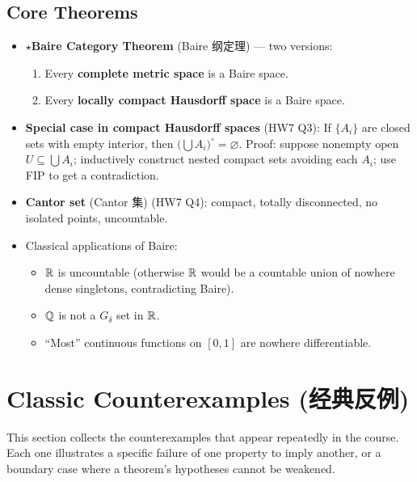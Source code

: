\documentclass{article}
\newcommand{\starKey}{\textcolor{red!65!black}{\textbf{$\star$}}}
\begin{document}
\subsection{Core Theorems}

\begin{itemize}
  \item \starKey \textbf{Baire Category Theorem} (Baire 纲定理) --- two versions:
  \begin{enumerate}
    \item Every \textbf{complete metric space} is a Baire space.
    \item Every \textbf{locally compact Hausdorff space} is a Baire space.
  \end{enumerate}

  \item \textbf{Special case in compact Hausdorff spaces} (HW7 Q3):
  If $\{A_i\}$ are closed sets with empty interior, then
  $\bigl(\bigcup A_i\bigr)^\circ=\varnothing$.
  Proof: suppose nonempty open $U\subseteq\bigcup A_i$; inductively construct nested
  compact sets avoiding each $A_i$; use FIP to get a contradiction.

  \item \textbf{Cantor set} (Cantor 集) (HW7 Q4):
  compact, totally disconnected, no isolated points, uncountable.

  \item Classical applications of Baire:
  \begin{itemize}
    \item $\mathbb{R}$ is uncountable (otherwise $\mathbb{R}$ would be a countable union of
    nowhere dense singletons, contradicting Baire).
    \item $\mathbb{Q}$ is not a $G_\delta$ set in $\mathbb{R}$.
    \item ``Most'' continuous functions on $[0,1]$ are nowhere differentiable.
  \end{itemize}
\end{itemize}

\section{Classic Counterexamples (经典反例)}

This section collects the counterexamples that appear repeatedly in the course.
Each one illustrates a specific failure of one property to imply another, or a
boundary case where a theorem's hypotheses cannot be weakened.
\end{document}
